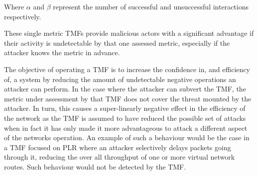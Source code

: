 Where $\alpha$ and $\beta$ represent the number of successful and unsuccessful interactions respectively.

These single metric TMFs provide malicious actors with a significant advantage if their activity is undetectable by that one assessed metric, especially if the attacker knows the metric in advance.

The objective of operating a TMF is to increase the confidence in, and efficiency of, a system by reducing the amount of undetectable negative operations an attacker can perform.
In the case where the attacker can subvert the TMF, the metric under assessment by that TMF does not cover the threat mounted by the attacker.
In turn, this causes a super-linearly negative effect in the efficiency of the network as the TMF is assumed to have reduced the possible set of attacks when in fact it has only made it more advantageous to attack a different aspect of the networks operation.
An example of such a behaviour would be the case in a TMF focused on PLR where an attacker selectively delays packets going through it, reducing the over all throughput of one or more virtual network routes.
Such behaviour would not be detected by the TMF.

